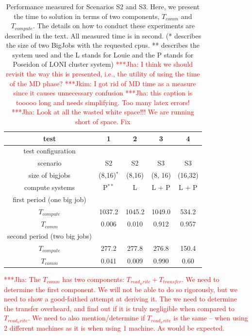 \documentclass[conference,final]{IEEEtran}
\newcommand{\jhanote}[1]{ {\textcolor{red} { ***Jha: #1 }}}
\newcommand{\Jkimnote}[1]{ {\textcolor{red} { ***Jkim: #1 }}}
\newcommand{\jhanote}[1]{}
\newcommand{\Jkimnote}[1]{}
\begin{document}
\begin{table}[!h]
\begin{center}
  \caption{\small Performance measured for Scenarios S2 and S3.  Here, we present the time to
    solution in terms of two components, ${T_{comm}}$ and
    ${T_{compute}}$.  The details on how to conduct these
    experiments are described in the text.  All measured time is in
    second. (* describes the size of two BigJobs with the requested cpus. ** describes the system used and the L stands for Louie and the P stands for Poseidon of LONI cluster system)
    \jhanote{I think we should revisit the way this is
      presented, i.e., the utility of using the time of the MD phase?}
    \Jkimnote{I got rid of MD time as a measure since it causes
      unnecessary confusion} \jhanote{this caption is tooooo long and
      needs simplifying. Too many latex errors!} \jhanote{Look at all
      the wasted white space!!! We are running short of space. Fix}}
\label{table:TwoBigJobs}
\begin{tabular}{ c | c  c  c  c}
\hline
test & 1 & 2 & 3 & 4  \\

\hline
test configuration &&& \\
scenario & S2 & S2 & S3 & S3 \\

size of bigjobs & (8,16)${^*}$  & (8,16) & (8, 16) & (16,32) \\
compute systems & P${^{**}}$  & L  &  L + P & L + P \\
\hline
first period (one big job) &   & & & \\
${T_{compute}}$ & 1037.2& 1045.2 & 1049.0 & 534.2\\
${T_{comm}}$ & 0.006 & 0.010 & 0.912 & 0.957 \\
\hline
second period (two big jobs)&   & & & \\
${T_{compute}}$ & 277.2 & 277.8& 276.8 & 150.4 \\
${T_{comm}}$ & 0.041 & 0.009 &  0.990 & 0.60 \\
\hline




\end{tabular}
\end{center}
\end{table}

\jhanote{The $T_{comm}$ has two components: $T_{read_write} +
  T_{transfer}$. We need to determine the first component. We will not
  be able to do so rigorously, but we need to show a good-faithed
  attempt at deriving it.  The we need to determine the transfer
  overheard, and find out if it is truly negligible when compared to
  $T_{read_write}$. We need to also mention/determine if
  $T_{read_write}$ is the same -- when using 2 different machines as
  it is when using 1 machine. As would be expected.}
\end{document}
